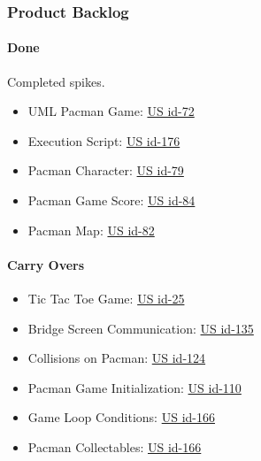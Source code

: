 \newpage

\subsubsection{Product Backlog}

\paragraph{Done}
Completed spikes.

\begin{itemize}
    \item UML Pacman Game: \href{https://tree.taiga.io/project/joseluis-teran-coffeetime/us/72?milestone=395911}{US id-72}
    \item Execution Script: \href{https://tree.taiga.io/project/joseluis-teran-coffeetime/us/4?milestone=390348}{US id-176}
    \item Pacman Character: \href{https://tree.taiga.io/project/joseluis-teran-coffeetime/us/3?milestone=390348}{US id-79}
    \item Pacman Game Score: \href{https://tree.taiga.io/project/joseluis-teran-coffeetime/us/5?milestone=390348}{US id-84}
    \item Pacman Map: \href{https://tree.taiga.io/project/joseluis-teran-coffeetime/us/6?milestone=390348}{US id-82}
\end{itemize}

\paragraph{Carry Overs}
\begin{itemize}
    \item Tic Tac Toe Game: \href{https://tree.taiga.io/project/joseluis-teran-coffeetime/us/25?milestone=395911}{US id-25}
    \item Bridge Screen Communication: \href{https://tree.taiga.io/project/joseluis-teran-coffeetime/us/6?milestone=390348}{US id-135}
    \item Collisions on Pacman: \href{https://tree.taiga.io/project/joseluis-teran-coffeetime/us/3?milestone=390348}{US id-124}
    \item Pacman Game Initialization: \href{https://tree.taiga.io/project/joseluis-teran-coffeetime/us/110?milestone=395911}{US id-110}
    \item Game Loop Conditions: \href{https://tree.taiga.io/project/joseluis-teran-coffeetime/us/5?milestone=390348}{US id-166}
    \item Pacman Collectables: \href{https://tree.taiga.io/project/joseluis-teran-coffeetime/us/5?milestone=390348}{US id-166}
\end{itemize}

